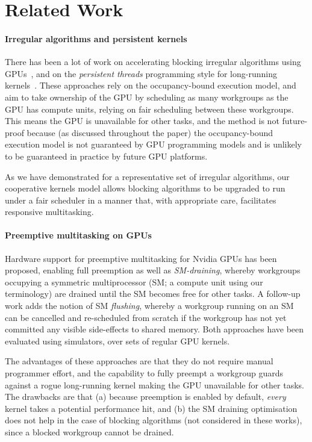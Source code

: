 \documentclass[numbers,nocopyrightspace,10pt]{sigplanconf}
\newcommand{\nvidia}{Nvidia\xspace}
\begin{document}
\section{Related Work}\label{sec:relatedwork}

\paragraph{Irregular algorithms and persistent kernels}

There has been a lot of work on accelerating blocking irregular
algorithms using GPUs~\cite{...}, and on the \emph{persistent threads}
programming style for long-running kernels~\cite{...}.  These
approaches rely on the occupancy-bound execution model, and aim to
take ownership of the GPU by scheduling as many workgroups as the GPU
has compute units, relying on fair scheduling between these
workgroups.  This means the GPU is unavailable for other tasks, and
the method is not future-proof because (as discussed throughout the
paper) the occupancy-bound execution model is not guaranteed by GPU
programming models and is unlikely to be guaranteed in practice by
future GPU platforms.

As we have demonstrated for a representative set of irregular
algorithms, our cooperative kernels model allows blocking algorithms
to be upgraded to run under a fair scheduler in a manner that, with
appropriate care, facilitates responsive multitasking.

\paragraph{Preemptive multitasking on GPUs}

Hardware support for preemptive multitasking for \nvidia GPUs has been
proposed, enabling full preemption as well as \emph{SM-draining},
whereby workgroups occupying a symmetric multiprocessor (SM; a compute
unit using our terminology) are drained until the SM becomes free for
other tasks.  A follow-up work adds the notion of SM \emph{flushing},
whereby a workgroup running on an SM can be cancelled and re-scheduled
from scratch if the workgroup has not yet committed any visible
side-effects to shared memory.  Both approaches have been evaluated
using simulators, over sets of regular GPU kernels.

The advantages of these approaches are that they do not require manual
programmer effort, and the capability to fully preempt a workgroup
guards against a rogue long-running kernel making the GPU unavailable
for other tasks.  The drawbacks are that (a) because preemption is
enabled by default, \emph{every} kernel takes a potential performance
hit, and (b) the SM draining optimisation does not help in the case of
blocking algorithms (not considered in these works), since a blocked
workgroup cannot be drained.
\end{document}
